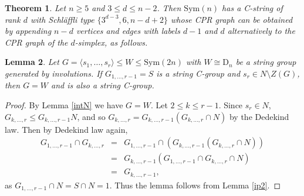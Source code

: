 \documentclass{amsart}
\numberwithin{equation}{section}
\theoremstyle{plain} %
\newtheorem{theorem}{Theorem}[section]
\newtheorem{lemma}[theorem]{Lemma}
\newcommand\vx{\node[circle, draw, fill=black, inner sep=0pt, minimum width=6pt]}
\begin{document}
\begin{theorem}{\cite[Lemma 21]{p20}} \label{skeleton}
Let $n \ge 5$ and $3 \leq d \leq n-2$. Then $\mathrm{Sym}(n)$ has a C-string of rank $d$ with Schl\"{a}ffli type $\{3^{d-3},6,n-d+2\}$ whose CPR graph can be obtained by appending $n-d$ vertices and edges with labels $d-1$ and $d$ alternatively to the CPR graph of the $d$-simplex, as follows. 
\begin{center}
\end{center}
\end{theorem}



\begin{lemma} \label{ipdn}
Let $G=\langle s_1,\dots, s_r\rangle \leq W \leq \mathrm{Sym}(2n)$ with $W \cong \mathrm{D}_n$ be a string group generated by involutions. If $G_{1,\dots,r-1}=S$ is a string C-group and $s_r \in N \setminus Z(G)$, then $G=W$ and is also a string C-group.
\end{lemma}

\begin{proof}
By Lemma \ref{intN} we have $G=W$. Let $2 \leq k \leq r-1$. Since $s_r \in N$, $G_{k,\dots,r} \leq G_{k,\dots,r-1}N$, and so $G_{k,\dots,r}=G_{k,\dots,r-1}(G_{k,\dots,r} \cap N)$ by the Dedekind law. Then by Dedekind law again,
\begin{eqnarray*}
    G_{1,\dots,r-1} \cap G_{k,\dots,r} &=& G_{1,\dots,r-1} \cap (G_{k,\dots,r-1}(G_{k,\dots,r} \cap N)) \\
    &=& G_{k,\dots,r-1}(G_{1,\dots,r-1} \cap G_{k,\dots,r} \cap N) \\
    &=& G_{k,\dots,r-1},
\end{eqnarray*}
as $G_{1,\dots,r-1} \cap N = S \cap N = 1$. Thus the lemma follows from Lemma \ref{ip2}.
\end{proof}
\end{document}
